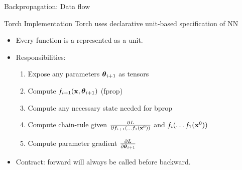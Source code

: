 \documentclass{beamer}
\begin{document}
\begin{frame}{Backpropagation: Data flow}
  \begin{center}

  \end{center}
\end{frame}

\begin{frame}{Torch Implementation}
  Torch uses declarative unit-based specification of NN
  \begin{itemize}
  \item Every function is a represented as a unit.
    \air

  \item Responsibilities:
    \begin{enumerate}
    \item Expose any parameters $\boldsymbol{\theta}_{i+1}$ as tensors
    \item Compute $f_{i+1}(\mathbf{x}, \boldsymbol{\theta}_{i+1})$ (fprop)
    \item Compute any necessary state needed for bprop
    \item Compute chain-rule given  $\frac{\partial L}{\partial f_{i+1}(\ldots f_1(\mathbf{x}^0))}$ and $f_{i}(\ldots f_1(\mathbf{x}^0))$
    \item Compute parameter gradient $\frac{\partial L}{\partial \boldsymbol{\theta}_{i+1}} $
    \end{enumerate}
  \item Contract: forward will always be called before backward.
  \end{itemize}
\end{frame}
\end{document}
